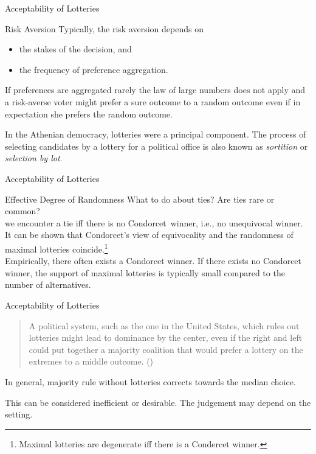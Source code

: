 \documentclass{beamer}
\theoremstyle{definition}
\def\g#1{{\usebeamercolor[fg]{block title example}{#1}}}
\begin{document}
\begin{frame}{Acceptability of Lotteries}
\begin{block}{Risk Aversion}
Typically, the risk aversion depends on
\begin{itemize}
    \item the stakes of the decision\pause, and
    \item the frequency of preference aggregation.
\end{itemize}\pause

If preferences are aggregated rarely the law of large numbers does not apply and a risk-averse voter might prefer a sure outcome to a random outcome even if in expectation she prefers the random outcome.
\end{block}\pause\vspace{10pt}

In the Athenian democracy, lotteries were a principal component. The process of selecting candidates by a lottery for a political office is also known as \emph{sortition} or \emph{selection by lot}.
\end{frame}

\begin{frame}{Acceptability of Lotteries}
\begin{block}{Effective Degree of Randomness}
What to do about ties? Are ties rare or common?\pause \\[15pt]

\g{Condorcet view:} we encounter a tie iff there is no Condorcet~winner, i.e., no unequivocal winner.\pause \\[5pt]
It can be shown that Condorcet's view of equivocality and the randomness of maximal lotteries coincide.\footnote{Maximal lotteries are degenerate iff there is a Condercet winner.}\pause \\[15pt]

Empirically, there often exists a Condorcet winner. If there exists no Condorcet winner, the support of maximal lotteries is typically small compared to the number of alternatives.
\end{block}
\end{frame}

\begin{frame}{Acceptability of Lotteries}
\blockquote{A political system, such as the one in the United States, which
 rules out lotteries might lead to dominance by the center, even if
 the right and left could put together a majority coalition that would
 prefer a lottery on the extremes to a middle outcome. (\cite{Zeckhauser1969})}\pause

In general, majority rule without lotteries corrects towards the median choice.\par
This can be considered inefficient or desirable. The judgement may depend on the setting.
\end{frame}
\end{document}
